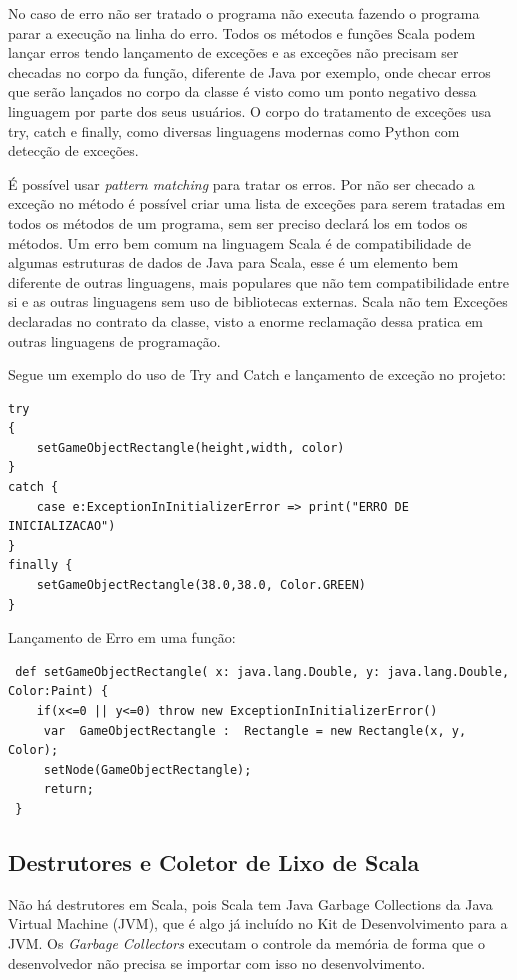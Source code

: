 \documentclass[rel-mlp]{iiufrgs}
\begin{document}
 No caso de erro não ser tratado o programa não executa fazendo o programa parar a execução na linha do erro. Todos os métodos e funções Scala podem lançar erros tendo lançamento de exceções e as exceções não precisam ser checadas no corpo da função, diferente de Java por exemplo, onde checar erros que serão lançados no corpo da classe é visto como um ponto negativo dessa linguagem por parte dos seus usuários. O corpo do tratamento de exceções usa try, catch e finally, como diversas linguagens modernas como Python com detecção de exceções.

 É possível usar \textit{pattern matching} para tratar os erros. Por não ser checado a exceção no método é possível criar uma lista de exceções para serem tratadas em todos os métodos de um programa, sem ser preciso declará los em todos os métodos. Um erro bem comum na linguagem Scala é de compatibilidade de algumas estruturas de dados de Java para Scala, esse é um elemento bem diferente de outras linguagens, mais populares que não tem compatibilidade entre si e as outras linguagens sem uso de bibliotecas externas. Scala não tem Exceções declaradas no contrato da classe, visto a enorme reclamação dessa pratica em outras linguagens de programação.

Segue um exemplo do uso de Try and Catch e lançamento de exceção no projeto:

\begin{lstlisting}
try
{
    setGameObjectRectangle(height,width, color)
}
catch {
    case e:ExceptionInInitializerError => print("ERRO DE INICIALIZACAO")
}
finally {
    setGameObjectRectangle(38.0,38.0, Color.GREEN)
}
\end{lstlisting}

Lançamento de Erro em uma função:
 
 \begin{lstlisting}
 def setGameObjectRectangle( x: java.lang.Double, y: java.lang.Double,  Color:Paint) {
    if(x<=0 || y<=0) throw new ExceptionInInitializerError()
     var  GameObjectRectangle :  Rectangle = new Rectangle(x, y, Color);
     setNode(GameObjectRectangle);
     return;
 }

\end{lstlisting}


\subsection{Destrutores e Coletor de Lixo de Scala}

 Não há destrutores em Scala, pois Scala tem Java Garbage Collections da Java Virtual Machine (JVM), que é algo já incluído no Kit de Desenvolvimento para a JVM. Os \textit{Garbage Collectors} executam o controle da memória de forma que o desenvolvedor não precisa se importar com isso no desenvolvimento. \cite{plumbr}
 
\end{document}
